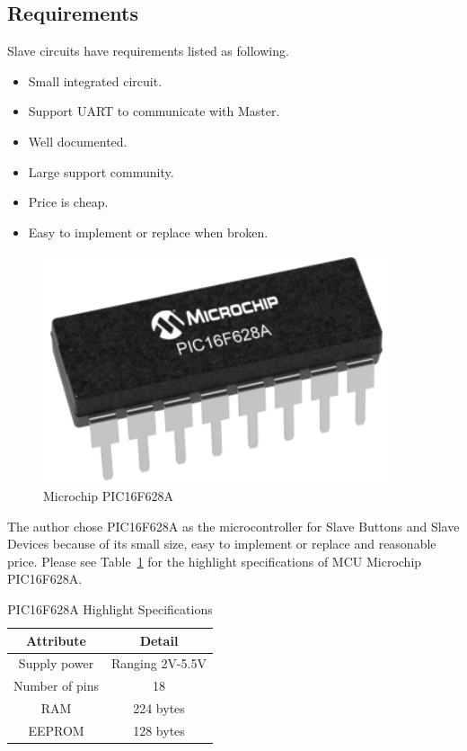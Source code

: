     \subsection{Requirements}
    Slave circuits have requirements listed as following.
        \begin{itemize}
        \item Small integrated circuit.
        \item Support UART to communicate with Master.
        \item Well documented.
        \item Large support community.        
        \item Price is cheap.
        \item Easy to implement or replace when broken.
        \end{itemize}
        \begin{figure}[!ht]
            \begin{center}
            \includegraphics[scale=1]{images/pic16f628a.png}
            \caption{Microchip PIC16F628A}
            \label{fig:picf16f628a}
            \end{center}
        \end{figure}
        The author chose PIC16F628A as the microcontroller for Slave Buttons and Slave Devices because of its small size, easy to implement or replace and reasonable price. Please see Table~\ref{table:pic16f628aSpecs} for the highlight specifications of MCU Microchip PIC16F628A.
        \begin{table}[h!]
            \begin{center}
            \begin{tabular}{ |c|c|  }
              \hline
              Attribute & Detail\\
              \hline
              Supply power& Ranging 2V-5.5V\\
              \hline
              Number of pins&   18\\
              \hline
              RAM &224 bytes\\
              \hline
              EEPROM & 128 bytes\\
              \hline
             \end{tabular}
             \caption{PIC16F628A Highlight Specifications}
             \label{table:pic16f628aSpecs}
            \end{center}
            \end{table}

